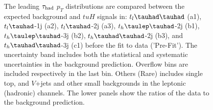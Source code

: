 \documentclass[PAPER, coverpage, atlasdraft=true, texlive=2016, UKenglish]{\ATLASLATEXPATH atlasdoc}
\providecommand{\DIFadd}[1]{{\protect\color{blue}\uwave{#1}}} %
\providecommand{\DIFdel}[1]{{\protect\color{red}\sout{#1}}}                      %
\providecommand{\DIFaddFL}[1]{\DIFadd{#1}} %
\providecommand{\DIFdelFL}[1]{\DIFdel{#1}} %
\providecommand{\DIFaddbeginFL}{} %
\providecommand{\DIFaddendFL}{} %
\providecommand{\DIFdelbeginFL}{} %
\providecommand{\DIFdelendFL}{} %
\begin{document}
\begin{figure}[H]
\begin{tabular}{@{}ccc@{}}
\end{tabular}
\caption{The leading $\tau_\text{had}$ $p_T$  distributions are compared between the expected background and $tuH$ signals in: \DIFdelbeginFL \DIFdelFL{$t_l\thadhad$ }\DIFdelendFL \DIFaddbeginFL \DIFaddFL{$t_{\ell}\thadhad$ }\DIFaddendFL (a1),  \DIFdelbeginFL \DIFdelFL{$t_l\tauhad$}\DIFdelendFL \DIFaddbeginFL \DIFaddFL{$t_{\ell}\tauhad$}\DIFaddendFL -1j (a2),  \DIFdelbeginFL \DIFdelFL{$t_l\tauhad$}\DIFdelendFL \DIFaddbeginFL \DIFaddFL{$t_{\ell}\tauhad$}\DIFaddendFL -2j (a3), $t_h\tlhad$-2j (b1), $t_h\tlhad$-3j (b2), $t_h\thadhad$-2j (b3), and $t_h\thadhad$-3j (c1) before the fit to data ('Pre-Fit'). The uncertainty band includes both the statistical and systematic uncertainties in the background prediction. Overflow bins are included respectively in the last bin. Others (Rare) includes single top, and $V$+jets and other small backgrounds in the leptonic (hadronic) 
channels. 
The lower panels show the ratios of the data to the background prediction.}
\label{fig:taupt_prefit}
\end{figure}
\end{document}
